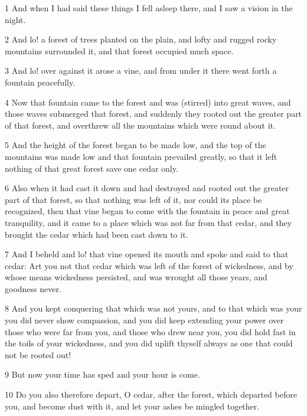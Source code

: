 \par 1 And when I had said these things I fell asleep there, and I saw a vision in the night. 

\par 2 And lo! a forest of trees planted on the plain, and lofty and rugged rocky mountains surrounded it, and that forest occupied much space. 

\par 3 And lo! over against it arose a vine, and from under it there went forth a fountain peacefully. 

\par 4 Now that fountain came to the forest and was (stirred) into great waves, and those waves submerged that forest, and suddenly they rooted out the greater part of that forest, and overthrew all the mountains which were round about it. 

\par 5 And the height of the forest began to be made low, and the top of the mountains was made low and that fountain prevailed greatly, so that it left nothing of that great forest save one cedar only. 

\par 6 Also when it had cast it down and had destroyed and rooted out the greater part of that forest, so that nothing was left of it, nor could its place be recognized, then that vine began to come with the fountain in peace and great tranquility, and it came to a place which was not far from that cedar, and they brought the cedar which had been cast down to it. 

\par 7 And I beheld and lo! that vine opened its mouth and spoke and said to that cedar: Art you not that cedar which was left of the forest of wickedness, and by whose means wickedness persisted, and was wrought all those years, and goodness never. 

\par 8 And you kept conquering that which was not yours, and to that which was your you did never show compassion, and you did keep extending your power over those who were far from you, and those who drew near you, you did hold fast in the toils of your wickedness, and you did uplift thyself always as one that could not be rooted out! 

\par 9 But now your time has sped and your hour is come. 

\par 10 Do you also therefore depart, O cedar, after the forest, which departed before you, and become dust with it, and let your ashes be mingled together. 

